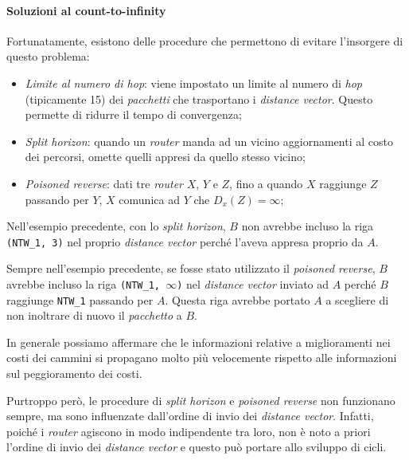 \paragraph{Soluzioni al count-to-infinity}
Fortunatamente, esistono delle procedure che permettono di evitare l'insorgere
di questo problema:
\begin{itemize}
    \item \emph{Limite al numero di hop}: viene impostato un limite al numero di
    \emph{hop} (tipicamente 15) dei \emph{pacchetti} che trasportano i
    \emph{distance vector}. Questo permette di ridurre il tempo di convergenza;
    \item \emph{Split horizon}: quando un \emph{router} manda ad un vicino
    aggiornamenti al costo dei percorsi, omette quelli appresi da quello stesso
    vicino;
    \item \emph{Poisoned reverse}: dati tre \emph{router} $X$, $Y$ e $Z$, fino
    a quando $X$ raggiunge $Z$ passando per $Y$, $X$ comunica ad $Y$ che $D_x(Z)=\infty$;
\end{itemize}
\begin{note}
    Nell'esempio precedente, con lo \emph{split horizon}, $B$ non avrebbe incluso
    la riga \texttt{(NTW\_1, 3)} nel proprio \emph{distance vector} perché l'aveva
    appresa proprio da $A$.
\end{note}
\begin{note}
    Sempre nell'esempio precedente, se fosse stato utilizzato il \emph{poisoned
    reverse}, $B$ avrebbe incluso la riga \texttt{(NTW\_1, $\infty$)} nel
    \emph{distance vector} inviato ad $A$ perché $B$ raggiunge \texttt{NTW\_1}
    passando per $A$. Questa riga avrebbe portato $A$ a scegliere di non inoltrare
    di nuovo il \emph{pacchetto} a $B$.
\end{note}\noindent
In generale possiamo affermare che le informazioni relative a miglioramenti nei
costi dei cammini si propagano molto più velocemente rispetto alle informazioni
sul peggioramento dei costi.

Purtroppo però, le procedure di \emph{split horizon} e \emph{poisoned reverse}
non funzionano sempre, ma sono influenzate dall'ordine di invio dei \emph{distance
vector}. Infatti, poiché i \emph{router} agiscono in modo indipendente tra loro,
non è noto a priori l'ordine di invio dei \emph{distance vector} e questo può
portare allo sviluppo di cicli.

